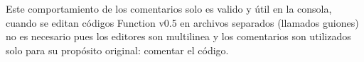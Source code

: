       Este comportamiento de los comentarios solo es valido y útil en la consola, cuando se editan códigos Function v0.5 en archivos separados (llamados guiones) no es necesario pues los editores son multilinea y los comentarios son utilizados solo para su propósito original: comentar el código.
      
      \begin{fxcode}
         \\
         \\
         \\
         \\
          
      \end{fxcode}
   
   
   
   
   
   
   
   
   
   
   
   
   
   
   
   
   
   
   
   
